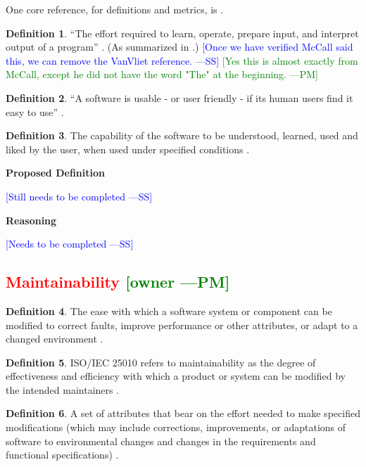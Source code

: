 \documentclass[letterpaper,cleveref]{lipics-v2019}
\newcommand{\authornote}[3]{\textcolor{#1}{[#3 ---#2]}}
\newcommand{\authornote}[3]{}
\newcommand{\wss}[1]{\authornote{blue}{SS}{#1}} %
\newcommand{\pmi}[1]{\authornote{green}{PM}{#1}} %
\newcommand{\notdone}[1]{\textcolor{red}{#1}}
\theoremstyle{definition}
\newtheorem{defn}{Definition}
\begin{document}
One core reference, for definitions and metrics, is
\citet{bevan1995measuring}.

\begin{defn}
  ``The effort required to learn, operate, prepare input, and interpret output
  of a program'' \citep{McCallEtAl1977}. (As summarized in
  \citet{VanVliet2000}.)  \wss{Once we have verified McCall said this, we can
    remove the VanVliet reference.} \pmi{Yes this is almost exactly from McCall, except he did not have the word "The" at the beginning.}
\end{defn}

\begin{defn}
  ``A software is usable - or user friendly - if its human users find it easy
  to use'' \citep{ghezzi1991fundamentals}.
\end{defn}

\begin{defn}
  The capability of the software to be understood, learned, used and liked by
  the user, when used under specified conditions \cite{ISO9126}.
\end{defn}
\noindent \textbf{Proposed Definition}

\wss{Still needs to be completed}

\noindent \textbf{Reasoning}

\wss{Needs to be completed}

\subsection{\notdone{Maintainability} \pmi{owner}}

\begin{defn} \label{MaintainabilityDefnSelected1} 
  The ease with which a software system or component can be modified to correct
  faults, improve performance or other attributes, or adapt to a changed
  environment \citep{IEEEStdGlossarySET1990}.
\end{defn}

\begin{defn}
  ISO/IEC 25010 refers to maintainability as the degree of effectiveness and
  efficiency with which a product or system can be modified by the intended
  maintainers \citep{ISO/IEC25010}.
\end{defn}

\begin{defn}
  A set of attributes that bear on the effort needed to make specified
  modifications (which may include corrections, improvements, or adaptations of
  software to environmental changes and changes in the requirements and
  functional specifications) \citep{pfleeger2006software}.
\end{defn}
\end{document}
